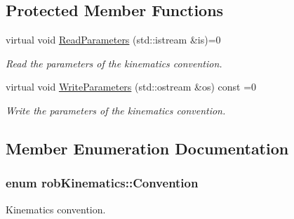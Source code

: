 \subsection*{Protected Member Functions}
\begin{DoxyCompactItemize}
\item 
virtual void \hyperlink{classrob_kinematics_a0bcf44445361f6c764cd0565c8f6b3c0}{Read\+Parameters} (std\+::istream \&is)=0
\begin{DoxyCompactList}\small\item\em Read the parameters of the kinematics convention. \end{DoxyCompactList}\item 
virtual void \hyperlink{classrob_kinematics_afbfe67b8baaed6fdee85bef681f195e1}{Write\+Parameters} (std\+::ostream \&os) const =0
\begin{DoxyCompactList}\small\item\em Write the parameters of the kinematics convention. \end{DoxyCompactList}\end{DoxyCompactItemize}


\subsection{Member Enumeration Documentation}
\hypertarget{classrob_kinematics_a298703e920da583d1f6aa60c8f65ca78}{}
\subsubsection[{Convention}]{\setlength{\rightskip}{0pt plus 5cm}enum {\bf rob\+Kinematics\+::\+Convention}}\label{classrob_kinematics_a298703e920da583d1f6aa60c8f65ca78}


Kinematics convention. 

